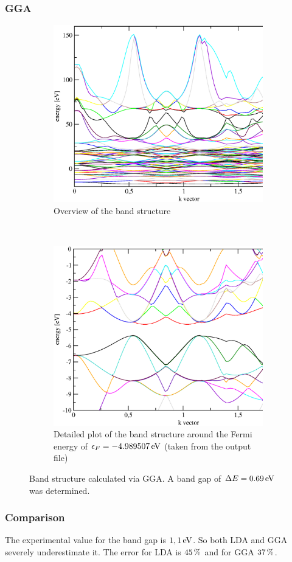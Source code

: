 \documentclass[12pt,a4paper]{scrartcl}
\begin{document}
\subsubsection{GGA}

\begin{figure}[H]
        \begin{subfigure}[a]{0.7\textwidth}
			\includegraphics[width=\linewidth]{./plots/GGA_all.eps}
    		\caption[GGA: band structure]{Overview of the band structure}
		\end{subfigure}
		~
        \begin{subfigure}[a]{0.7\textwidth}
			\includegraphics[width=\linewidth]{./plots/GGA_gap.eps}
    		\caption[GGA: band gap]{Detailed plot of the band structure around the Fermi energy of $\epsilon_F = \unit[-4.989507]{eV}$ (taken from the output file)}
		\end{subfigure}
        \caption{Band structure calculated via GGA. A band gap of $\Delta E = \unit[0.69]{eV}$ was determined.}
        \label{fig:bandGGA}
\end{figure}

\subsubsection{Comparison}
The experimental value for the band gap is $\unit[1,1]{eV}$. So both LDA and GGA severely underestimate it. The error for LDA is $\unit[45]{\%}$ and for GGA $\unit[37]{\%}$.
\end{document}
